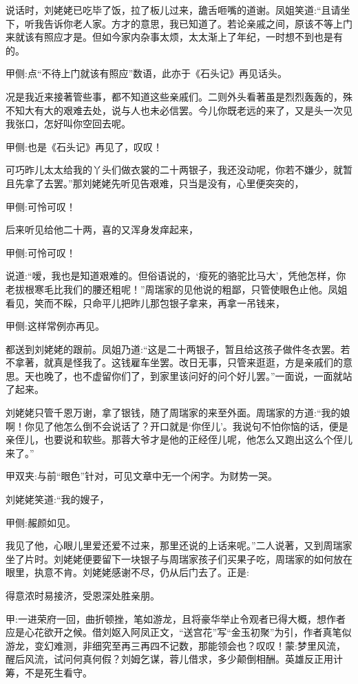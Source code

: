 \begin{parag}
    说话时，刘姥姥已吃毕了饭，拉了板儿过来，舚舌咂嘴的道谢。凤姐笑道:“且请坐下，听我告诉你老人家。方才的意思，我已知道了。若论亲戚之间，原该不等上门来就该有照应才是。但如今家内杂事太烦，太太渐上了年纪，一时想不到也是有的。\begin{note}甲侧:点“不待上门就该有照应”数语，此亦于《石头记》再见话头。\end{note}况是我近来接著管些事，都不知道这些亲戚们。二则外头看著虽是烈烈轰轰的，殊不知大有大的艰难去处，说与人也未必信罢。今儿你既老远的来了，又是头一次见我张口，怎好叫你空回去呢。\begin{note}甲侧:也是《石头记》再见了，叹叹！\end{note}可巧昨儿太太给我的丫头们做衣裳的二十两银子，我还没动呢，你若不嫌少，就暂且先拿了去罢。”那刘姥姥先听见告艰难，只当是没有，心里便突突的，\begin{note}甲侧:可怜可叹！\end{note}后来听见给他二十两，喜的又浑身发痒起来，\begin{note}甲侧:可怜可叹！\end{note}说道:“嗳，我也是知道艰难的。但俗语说的，‘瘦死的骆驼比马大’，凭他怎样，你老拔根寒毛比我们的腰还粗呢！”周瑞家的见他说的粗鄙，只管使眼色止他。凤姐看见，笑而不睬，只命平儿把昨儿那包银子拿来，再拿一吊钱来，\begin{note}甲侧:这样常例亦再见。\end{note}都送到刘姥姥的跟前。凤姐乃道:“这是二十两银子，暂且给这孩子做件冬衣罢。若不拿著，就真是怪我了。这钱雇车坐罢。改日无事，只管来逛逛，方是亲戚们的意思。天也晚了，也不虚留你们了，到家里该问好的问个好儿罢。”一面说，一面就站了起来。
\end{parag}


\begin{parag}
    刘姥姥只管千恩万谢，拿了银钱，随了周瑞家的来至外面。周瑞家的方道:“我的娘啊！你见了他怎么倒不会说话了？开口就是‘你侄儿’。我说句不怕你恼的话，便是亲侄儿，也要说和软些。那蓉大爷才是他的正经侄儿呢，他怎么又跑出这么个侄儿来了。”\begin{note}甲双夹:与前“眼色”针对，可见文章中无一个闲字。为财势一哭。\end{note}刘姥姥笑道:“我的嫂子，\begin{note}甲侧:赧颜如见。\end{note}我见了他，心眼儿里爱还爱不过来，那里还说的上话来呢。”二人说著，又到周瑞家坐了片时。刘姥姥便要留下一块银子与周瑞家孩子们买果子吃，周瑞家的如何放在眼里，执意不肯。刘姥姥感谢不尽，仍从后门去了。正是:
\end{parag}


\begin{poem}
    \begin{pl}得意浓时易接济，受恩深处胜亲朋。\end{pl}
\end{poem}


\begin{parag}
    \begin{note}甲:一进荣府一回，曲折顿挫，笔如游龙，且将豪华举止令观者已得大概，想作者应是心花欲开之候。借刘妪入阿凤正文，“送宫花”写“金玉初聚”为引，作者真笔似游龙，变幻难测，非细究至再三再四不记数，那能领会也？叹叹！蒙:梦里风流，醒后风流，试问何真何假？刘姆乞谋，蓉儿借求，多少颠倒相酬。英雄反正用计筹，不是死生看守。\end{note}
\end{parag}
